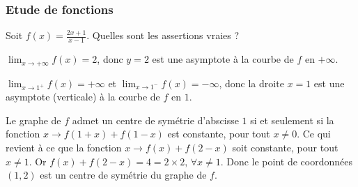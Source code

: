 \subsubsection{Etude de fonctions}


\begin{question} 
Soit $ f(x)= \frac{2x+1}{x-1}$. Quelles sont les assertions vraies ?
\begin{answers}



\end{answers}
\begin{explanations}
$\lim_{x\to +\infty}f(x)=2$, donc $y=2$ est une asymptote à la courbe de $f$ en $+\infty$.

$\lim_{x\to 1^+}f(x)=+\infty$ et $\lim_{x\to 1^-}f(x)=-\infty$, donc la droite $x=1$ est une asymptote (verticale) à la courbe de $f$ en $1$.

Le graphe de $f$ admet un centre de symétrie d'abscisse $1$ si et seulement si la fonction $x\to f(1+x)+f(1-x)$ est constante, pour tout $x\neq 0$. Ce qui revient à ce que la fonction $x\to f(x)+f(2-x)$ soit constante, pour tout $x\neq 1$. Or $f(x)+f(2-x)=4=2\times 2, \, \forall x \neq 1$. Donc le point de coordonnées $(1,2)$ est un centre de symétrie du graphe de $f$.
\end{explanations}

\end{question}


